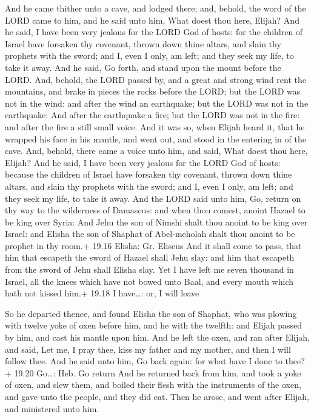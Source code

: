  And he came thither unto a cave, and lodged there; and,
behold, the word of the LORD came to him, and he said unto him, What
doest thou here, Elijah?  And he said, I have been very
jealous for the LORD God of hosts: for the children of Israel have
forsaken thy covenant, thrown down thine altars, and slain thy prophets
with the sword; and I, even I only, am left; and they seek my life, to
take it away.  And he said, Go forth, and stand upon the
mount before the LORD. And, behold, the LORD passed by, and a great and
strong wind rent the mountains, and brake in pieces the rocks before the
LORD; but the LORD was not in the wind: and after the wind an
earthquake; but the LORD was not in the earthquake:  And
after the earthquake a fire; but the LORD was not in the fire: and after
the fire a still small voice.  And it was so, when Elijah
heard it, that he wrapped his face in his mantle, and went out, and
stood in the entering in of the cave. And, behold, there came a voice
unto him, and said, What doest thou here, Elijah?  And he
said, I have been very jealous for the LORD God of hosts: because the
children of Israel have forsaken thy covenant, thrown down thine altars,
and slain thy prophets with the sword; and I, even I only, am left; and
they seek my life, to take it away.  And the LORD said unto
him, Go, return on thy way to the wilderness of Damascus: and when thou
comest, anoint Hazael to be king over Syria:  And Jehu the
son of Nimshi shalt thou anoint to be king over Israel: and Elisha the
son of Shaphat of Abel-meholah shalt thou anoint to be prophet in thy
room.+ 19.16 Elisha: Gr. Eliseus  And it shall come to
pass, that him that escapeth the sword of Hazael shall Jehu slay: and
him that escapeth from the sword of Jehu shall Elisha slay.
 Yet I have left me seven thousand in Israel, all the knees
which have not bowed unto Baal, and every mouth which hath not kissed
him.+ 19.18 I have\ldots: or, I will leave

 So he departed thence, and found Elisha the son of
Shaphat, who was plowing with twelve yoke of oxen before him, and he
with the twelfth: and Elijah passed by him, and cast his mantle upon
him.  And he left the oxen, and ran after Elijah, and said,
Let me, I pray thee, kiss my father and my mother, and then I will
follow thee. And he said unto him, Go back again: for what have I done
to thee?+ 19.20 Go\ldots: Heb. Go return  And he returned
back from him, and took a yoke of oxen, and slew them, and boiled their
flesh with the instruments of the oxen, and gave unto the people, and
they did eat. Then he arose, and went after Elijah, and ministered unto
him.

